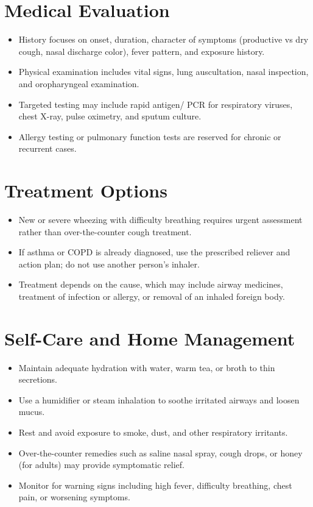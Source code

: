 \section*{Medical Evaluation}
\begin{itemize}
  \item History focuses on onset, duration, character of symptoms (productive vs dry cough, nasal discharge color), fever pattern, and exposure history.
  \item Physical examination includes vital signs, lung auscultation, nasal inspection, and oropharyngeal examination.
  \item Targeted testing may include rapid antigen/ PCR for respiratory viruses, chest X-ray, pulse oximetry, and sputum culture.
  \item Allergy testing or pulmonary function tests are reserved for chronic or recurrent cases.
\end{itemize}

\section*{Treatment Options}
\begin{itemize}
  \item New or severe wheezing with difficulty breathing requires urgent assessment rather than over-the-counter cough treatment.
  \item If asthma or COPD is already diagnosed, use the prescribed reliever and action plan; do not use another person’s inhaler.
  \item Treatment depends on the cause, which may include airway medicines, treatment of infection or allergy, or removal of an inhaled foreign body.
\end{itemize}

\section*{Self-Care and Home Management}
\begin{itemize}
  \item Maintain adequate hydration with water, warm tea, or broth to thin secretions.
  \item Use a humidifier or steam inhalation to soothe irritated airways and loosen mucus.
  \item Rest and avoid exposure to smoke, dust, and other respiratory irritants.
  \item Over-the-counter remedies such as saline nasal spray, cough drops, or honey (for adults) may provide symptomatic relief.
  \item Monitor for warning signs including high fever, difficulty breathing, chest pain, or worsening symptoms.
\end{itemize}

